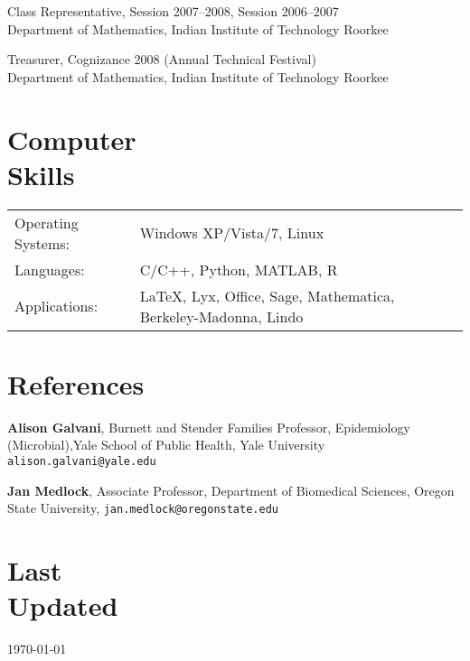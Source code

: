 \documentclass[margin,line,pifont,palatino,courier]{res}
\begin{document}
\begin{resume}
Class Representative, Session 2007--2008, Session 2006--2007  \\
Department of Mathematics, Indian Institute of Technology Roorkee

Treasurer, Cognizance 2008 (Annual Technical Festival) \\
Department of Mathematics, Indian Institute of Technology Roorkee

\section{\sc Computer \\ Skills}

\begin{tabular}{@{}p{1.2in}p{6in}}

Operating Systems:& Windows XP/Vista/7, Linux\\
Languages: & C/C++, Python, MATLAB, R \\
Applications: & \LaTeX, Lyx, Office, Sage, Mathematica, Berkeley-Madonna, Lindo
\end{tabular}







\newpage

\section{\sc References}
{\bf Alison Galvani}, Burnett and Stender Families Professor, Epidemiology (Microbial),Yale School of Public Health, Yale University
\texttt{alison.galvani@yale.edu}


{\bf Jan Medlock}, Associate Professor, Department of Biomedical Sciences,
Oregon State University,
\texttt{jan.medlock@oregonstate.edu}






\section{\sc Last \\ Updated}  \today

\end{resume}
\end{document}
